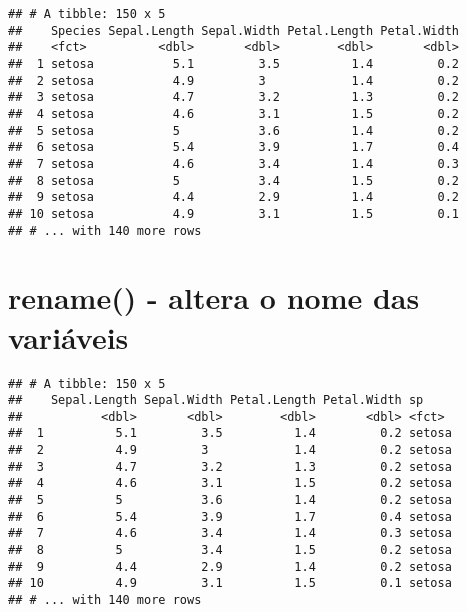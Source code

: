 \documentclass[]{book}
\newenvironment{Shaded}{\begin{snugshade}}{\end{snugshade}}
\newcommand{\DataTypeTok}[1]{\textcolor[rgb]{0.13,0.29,0.53}{#1}}
\newcommand{\KeywordTok}[1]{\textcolor[rgb]{0.13,0.29,0.53}{\textbf{#1}}}
\newcommand{\NormalTok}[1]{#1}
\newcommand{\OperatorTok}[1]{\textcolor[rgb]{0.81,0.36,0.00}{\textbf{#1}}}
\newcommand{\StringTok}[1]{\textcolor[rgb]{0.31,0.60,0.02}{#1}}
\begin{document}
\begin{Shaded}
\end{Shaded}

\begin{verbatim}
## # A tibble: 150 x 5
##    Species Sepal.Length Sepal.Width Petal.Length Petal.Width
##    <fct>          <dbl>       <dbl>        <dbl>       <dbl>
##  1 setosa           5.1         3.5          1.4         0.2
##  2 setosa           4.9         3            1.4         0.2
##  3 setosa           4.7         3.2          1.3         0.2
##  4 setosa           4.6         3.1          1.5         0.2
##  5 setosa           5           3.6          1.4         0.2
##  6 setosa           5.4         3.9          1.7         0.4
##  7 setosa           4.6         3.4          1.4         0.3
##  8 setosa           5           3.4          1.5         0.2
##  9 setosa           4.4         2.9          1.4         0.2
## 10 setosa           4.9         3.1          1.5         0.1
## # ... with 140 more rows
\end{verbatim}

\hypertarget{rename---altera-o-nome-das-variuxe1veis}{%
\section{rename() - altera o nome das variáveis}\label{rename---altera-o-nome-das-variuxe1veis}}

\begin{Shaded}
\end{Shaded}

\begin{verbatim}
## # A tibble: 150 x 5
##    Sepal.Length Sepal.Width Petal.Length Petal.Width sp    
##           <dbl>       <dbl>        <dbl>       <dbl> <fct> 
##  1          5.1         3.5          1.4         0.2 setosa
##  2          4.9         3            1.4         0.2 setosa
##  3          4.7         3.2          1.3         0.2 setosa
##  4          4.6         3.1          1.5         0.2 setosa
##  5          5           3.6          1.4         0.2 setosa
##  6          5.4         3.9          1.7         0.4 setosa
##  7          4.6         3.4          1.4         0.3 setosa
##  8          5           3.4          1.5         0.2 setosa
##  9          4.4         2.9          1.4         0.2 setosa
## 10          4.9         3.1          1.5         0.1 setosa
## # ... with 140 more rows
\end{verbatim}
\end{document}
